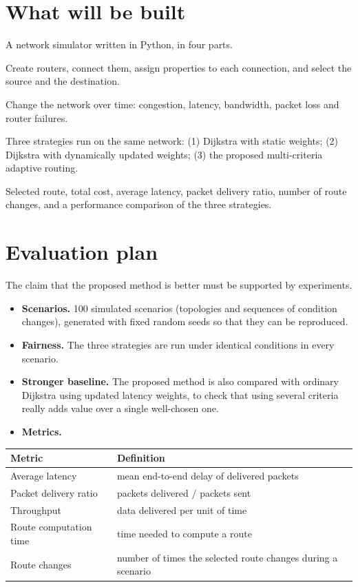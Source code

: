 \documentclass[11pt,a4paper]{article}
\begin{document}
\section{What will be built}
A network simulator written in Python, in four parts.

\begin{description}[leftmargin=1.2cm,style=nextline]
\item[A. Topology editor] Create routers, connect them, assign properties to each connection, and
select the source and the destination.
\item[B. Condition simulator] Change the network over time: congestion, latency, bandwidth, packet
loss and router failures.
\item[C. Routing engine] Three strategies run on the same network:
  (1) Dijkstra with static weights;
  (2) Dijkstra with dynamically updated weights;
  (3) the proposed multi-criteria adaptive routing.
\item[D. Results dashboard] Selected route, total cost, average latency, packet delivery ratio,
number of route changes, and a performance comparison of the three strategies.
\end{description}

\section{Evaluation plan}
The claim that the proposed method is better must be supported by experiments.

\begin{itemize}[leftmargin=*]
\item \textbf{Scenarios.} 100 simulated scenarios (topologies and sequences of condition changes),
generated with fixed random seeds so that they can be reproduced.
\item \textbf{Fairness.} The three strategies are run under identical conditions in every scenario.
\item \textbf{Stronger baseline.} The proposed method is also compared with ordinary Dijkstra using
updated latency weights, to check that using several criteria really adds value over a single
well-chosen one.
\item \textbf{Metrics.}
\end{itemize}

\begin{center}
\begin{tabularx}{\textwidth}{lL}
\toprule
Metric & Definition \\
\midrule
Average latency & mean end-to-end delay of delivered packets \\
Packet delivery ratio & packets delivered $/$ packets sent \\
Throughput & data delivered per unit of time \\
Route computation time & time needed to compute a route \\
Route changes & number of times the selected route changes during a scenario \\
\bottomrule
\end{tabularx}
\end{center}
\end{document}
